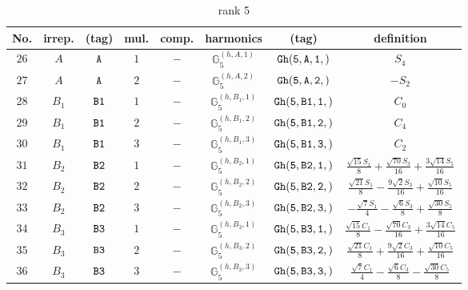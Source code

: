 \documentclass[fleqn,8pt]{jsarticle}
\begin{document}
\begin{table}[ht!]
\begin{center}
\caption{rank 5}
\renewcommand{\arraystretch}{1.3}
\begin{tabular}{cccccccc} \hline \hline
No. & irrep. & (tag) & mul. & comp. & harmonics & (tag) & definition \\ \hline
$ 26 $ & $ A $ & $ {\tt A} $ & $ 1 $ & $ - $ & $ \mathbb{G}_{5}^{(h,A,1)} $ & $ {\tt Gh(5,A,1,)} $ & $ S_{4} $ \\
$ 27 $ & $ A $ & $ {\tt A} $ & $ 2 $ & $ - $ & $ \mathbb{G}_{5}^{(h,A,2)} $ & $ {\tt Gh(5,A,2,)} $ & $ - S_{2} $ \\
$ 28 $ & $ B_{1} $ & $ {\tt B1} $ & $ 1 $ & $ - $ & $ \mathbb{G}_{5}^{(h,B_{1},1)} $ & $ {\tt Gh(5,B1,1,)} $ & $ C_{0} $ \\
$ 29 $ & $ B_{1} $ & $ {\tt B1} $ & $ 2 $ & $ - $ & $ \mathbb{G}_{5}^{(h,B_{1},2)} $ & $ {\tt Gh(5,B1,2,)} $ & $ C_{4} $ \\
$ 30 $ & $ B_{1} $ & $ {\tt B1} $ & $ 3 $ & $ - $ & $ \mathbb{G}_{5}^{(h,B_{1},3)} $ & $ {\tt Gh(5,B1,3,)} $ & $ C_{2} $ \\
$ 31 $ & $ B_{2} $ & $ {\tt B2} $ & $ 1 $ & $ - $ & $ \mathbb{G}_{5}^{(h,B_{2},1)} $ & $ {\tt Gh(5,B2,1,)} $ & $ \frac{\sqrt{15} S_{1}}{8} + \frac{\sqrt{70} S_{3}}{16} + \frac{3 \sqrt{14} S_{5}}{16} $ \\
$ 32 $ & $ B_{2} $ & $ {\tt B2} $ & $ 2 $ & $ - $ & $ \mathbb{G}_{5}^{(h,B_{2},2)} $ & $ {\tt Gh(5,B2,2,)} $ & $ \frac{\sqrt{21} S_{1}}{8} - \frac{9 \sqrt{2} S_{3}}{16} + \frac{\sqrt{10} S_{5}}{16} $ \\
$ 33 $ & $ B_{2} $ & $ {\tt B2} $ & $ 3 $ & $ - $ & $ \mathbb{G}_{5}^{(h,B_{2},3)} $ & $ {\tt Gh(5,B2,3,)} $ & $ - \frac{\sqrt{7} S_{1}}{4} - \frac{\sqrt{6} S_{3}}{8} + \frac{\sqrt{30} S_{5}}{8} $ \\
$ 34 $ & $ B_{3} $ & $ {\tt B3} $ & $ 1 $ & $ - $ & $ \mathbb{G}_{5}^{(h,B_{3},1)} $ & $ {\tt Gh(5,B3,1,)} $ & $ \frac{\sqrt{15} C_{1}}{8} - \frac{\sqrt{70} C_{3}}{16} + \frac{3 \sqrt{14} C_{5}}{16} $ \\
$ 35 $ & $ B_{3} $ & $ {\tt B3} $ & $ 2 $ & $ - $ & $ \mathbb{G}_{5}^{(h,B_{3},2)} $ & $ {\tt Gh(5,B3,2,)} $ & $ \frac{\sqrt{21} C_{1}}{8} + \frac{9 \sqrt{2} C_{3}}{16} + \frac{\sqrt{10} C_{5}}{16} $ \\
$ 36 $ & $ B_{3} $ & $ {\tt B3} $ & $ 3 $ & $ - $ & $ \mathbb{G}_{5}^{(h,B_{3},3)} $ & $ {\tt Gh(5,B3,3,)} $ & $ \frac{\sqrt{7} C_{1}}{4} - \frac{\sqrt{6} C_{3}}{8} - \frac{\sqrt{30} C_{5}}{8} $ \\
 \hline \hline
\end{tabular}
\end{center}
\end{table}
\end{document}
